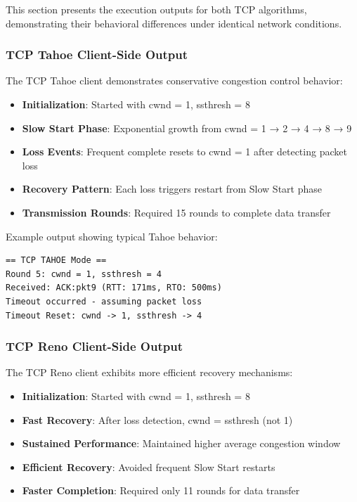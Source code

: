 \documentclass[12pt]{article}
\begin{document}
This section presents the execution outputs for both TCP algorithms, demonstrating their behavioral differences under identical network conditions.

\subsubsection{TCP Tahoe Client-Side Output}

The TCP Tahoe client demonstrates conservative congestion control behavior:

\begin{itemize}
    \item \textbf{Initialization}: Started with cwnd = 1, ssthresh = 8
    \item \textbf{Slow Start Phase}: Exponential growth from cwnd = 1 → 2 → 4 → 8 → 9
    \item \textbf{Loss Events}: Frequent complete resets to cwnd = 1 after detecting packet loss
    \item \textbf{Recovery Pattern}: Each loss triggers restart from Slow Start phase
    \item \textbf{Transmission Rounds}: Required 15 rounds to complete data transfer
\end{itemize}

Example output showing typical Tahoe behavior:
\begin{verbatim}
== TCP TAHOE Mode ==
Round 5: cwnd = 1, ssthresh = 4
Received: ACK:pkt9 (RTT: 171ms, RTO: 500ms)
Timeout occurred - assuming packet loss
Timeout Reset: cwnd -> 1, ssthresh -> 4
\end{verbatim}

\subsubsection{TCP Reno Client-Side Output}

The TCP Reno client exhibits more efficient recovery mechanisms:

\begin{itemize}
    \item \textbf{Initialization}: Started with cwnd = 1, ssthresh = 8
    \item \textbf{Fast Recovery}: After loss detection, cwnd = ssthresh (not 1)
    \item \textbf{Sustained Performance}: Maintained higher average congestion window
    \item \textbf{Efficient Recovery}: Avoided frequent Slow Start restarts
    \item \textbf{Faster Completion}: Required only 11 rounds for data transfer
\end{itemize}
\end{document}
